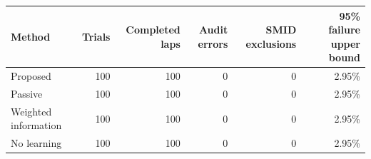 \begin{tabular}{lrrrrr}
\toprule
Method & Trials & Completed laps & Audit errors & SMID exclusions & 95\% failure upper bound \\
\midrule
Proposed & 100 & 100 & 0 & 0 & 2.95\% \\
Passive & 100 & 100 & 0 & 0 & 2.95\% \\
Weighted information & 100 & 100 & 0 & 0 & 2.95\% \\
No learning & 100 & 100 & 0 & 0 & 2.95\% \\
\bottomrule
\end{tabular}
